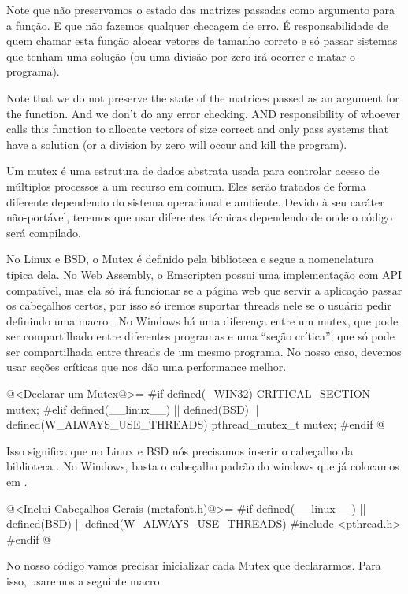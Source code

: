 Note que não preservamos o estado das matrizes passadas como argumento
para a função. E que não fazemos qualquer checagem de erro. É
responsabilidade de quem chamar esta função alocar vetores de tamanho
correto e só passar sistemas que tenham uma solução (ou uma divisão
por zero irá ocorrer e matar o programa).

Note that we do not preserve the state of the matrices passed as an
argument for the function. And we don't do any error checking. AND
responsibility of whoever calls this function to allocate vectors of
size correct and only pass systems that have a solution (or a division
by zero will occur and kill the program).


Um mutex é uma estrutura de dados abstrata usada para controlar acesso
de múltiplos processos a um recurso em comum. Eles serão tratados de
forma diferente dependendo do sistema operacional e ambiente. Devido à
seu caráter não-portável, teremos que usar diferentes técnicas
dependendo de onde o código será compilado.

No Linux e BSD, o Mutex é definido pela biblioteca
 e segue a nomenclatura típica dela. No Web Assembly,
o Emscripten possui uma implementação com API compatível, mas ela só
irá funcionar se a página web que servir a aplicação passar os
cabeçalhos certos, por isso só iremos suportar threads nele se o
usuário pedir definindo uma
macro . No Windows há uma
diferença entre um mutex, que pode ser compartilhado entre diferentes
programas e uma ``seção crítica'', que só pode ser compartilhada entre
threads de um mesmo programa. No nosso caso, devemos usar seções
críticas que nos dão uma performance melhor.

\iniciocodigo
@<Declarar um Mutex@>=
#if defined(_WIN32)
CRITICAL_SECTION mutex;
#elif defined(__linux__) || defined(BSD) || defined(W_ALWAYS_USE_THREADS)
pthread_mutex_t mutex;
#endif
@
\fimcodigo

Isso significa que no Linux e BSD nós precisamos inserir o cabeçalho
da biblioteca . No Windows, basta o cabeçalho
padrão do windows que já colocamos em .

\iniciocodigo
@<Inclui Cabeçalhos Gerais (metafont.h)@>=
#if defined(__linux__) || defined(BSD) || defined(W_ALWAYS_USE_THREADS)
#include <pthread.h>
#endif
@
\fimcodigo

No nosso código vamos precisar inicializar cada Mutex que
declararmos. Para isso, usaremos a seguinte macro:

